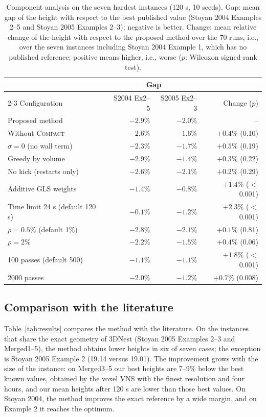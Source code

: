 \documentclass[preprint,12pt,authoryear]{elsarticle}
\begin{document}
\begin{table}[!tbp]
\centering\small
\caption{Component analysis on the seven hardest instances (120 s, 10 seeds). Gap: mean gap of the height with
respect to the best published value (Stoyan 2004 Examples 2--5 and Stoyan 2005 Examples 2--3); negative is
better. Change: mean relative change of the height with respect to the proposed method over the 70 runs,
i.e., over the seven instances including Stoyan 2004 Example 1, which has no published reference; positive means
higher, i.e., worse ($p$: Wilcoxon signed-rank test).}
\label{tab:ablation}
\begin{tabular}{lrrr}
\toprule
& \multicolumn{2}{c}{Gap} & \\
\cmidrule(lr){2-3}
Configuration & S2004 Ex2--5 & S2005 Ex2--3 & Change ($p$)\\
\midrule
Proposed method & $-2.9\%$ & $-2.0\%$ & --\\
Without \textsc{Compact} & $-2.6\%$ & $-1.6\%$ & $+0.4\%$ (0.10)\\
$\sigma=0$ (no wall term) & $-2.3\%$ & $-1.7\%$ & $+0.5\%$ (0.19)\\
Greedy by volume & $-2.9\%$ & $-1.4\%$ & $+0.3\%$ (0.22)\\
No kick (restarts only) & $-2.6\%$ & $-2.1\%$ & $+0.2\%$ (0.29)\\
Additive GLS weights & $-1.4\%$ & $-0.8\%$ & $+1.4\%$ ($<$0.001)\\
\midrule
Time limit 24 s (default 120 s) & $-0.1\%$ & $-1.2\%$ & $+2.3\%$ ($<$0.001)\\
$\rho=0.5\%$ (default 1\%) & $-2.8\%$ & $-2.1\%$ & $+0.1\%$ (0.81)\\
$\rho=2\%$ & $-2.2\%$ & $-1.5\%$ & $+0.4\%$ (0.06)\\
100 passes (default 500) & $-1.1\%$ & $-1.1\%$ & $+1.8\%$ ($<$0.001)\\
2000 passes & $-2.0\%$ & $-1.2\%$ & $+0.7\%$ (0.008)\\
\bottomrule
\end{tabular}
\end{table}

\subsection{Comparison with the literature}
Table~\ref{tab:results} compares the method with the literature. On the instances that share the exact
geometry of 3DNest (Stoyan 2005 Examples 2--3 and Merged1--5), the method obtains lower heights in six of seven
cases; the exception is Stoyan 2005 Example 2 (19.14 versus 19.01). The improvement grows with the size of the
instance: on Merged3--5 our best heights are 7--9\% below the best known values, obtained by the voxel VNS
with the finest resolution and four hours, and our mean heights after 120 s are lower than those best values. On Stoyan 2004, the method improves the exact reference by
a wide margin, and on Example 2 it reaches the optimum.
\end{document}
